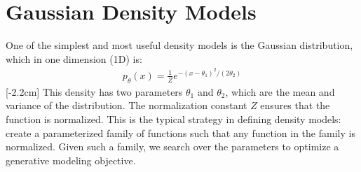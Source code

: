 
\section{Gaussian Density Models}\label{sec:generative_models:gaussian_density_models}

One of the simplest and most useful density models is the Gaussian distribution, which in one dimension (1D) is:
\begin{align}
    p_{\theta}(x) = \frac{1}{Z}e^{-(x-\theta_1)^2/(2\theta_2)}
\end{align}
[-2.2cm]
This density has two parameters $\theta_1$ and $\theta_2$, which are the mean and variance of the distribution. The normalization constant $Z$ ensures that the function is normalized. This is the typical strategy in defining density models: create a parameterized family of functions such that any function in the family is normalized. Given such a family, we search over the parameters to optimize a generative modeling objective.

